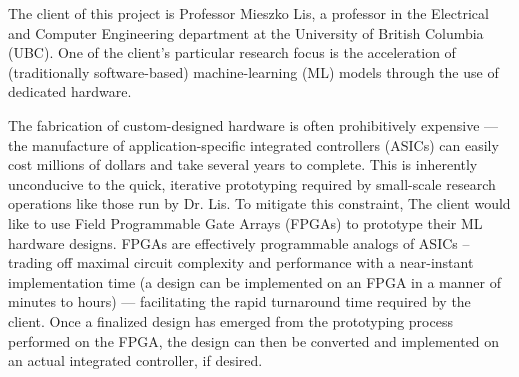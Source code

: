 The client of this project is Professor Mieszko Lis, a professor in the Electrical and Computer Engineering department at the University of British Columbia (UBC). One of the client's particular research focus is the acceleration of (traditionally software-based) machine-learning (ML) models through the use of dedicated hardware. 

The fabrication of custom-designed hardware is often prohibitively expensive --- the manufacture of application-specific integrated controllers (ASICs) can easily cost millions of dollars and take several years to complete. This is inherently unconducive to the quick, iterative prototyping required by small-scale research operations like those run by Dr. Lis. To mitigate this constraint, The client would like to use Field Programmable Gate Arrays (FPGAs) to prototype their ML hardware designs. FPGAs are effectively programmable analogs of ASICs -- trading off maximal circuit complexity and performance with a near-instant implementation time (a design can be implemented on an FPGA in a manner of minutes to hours) --- facilitating the rapid turnaround time required by the client. Once a finalized design has emerged from the prototyping process performed on the FPGA, the design can then be converted and implemented on an actual integrated controller, if desired.